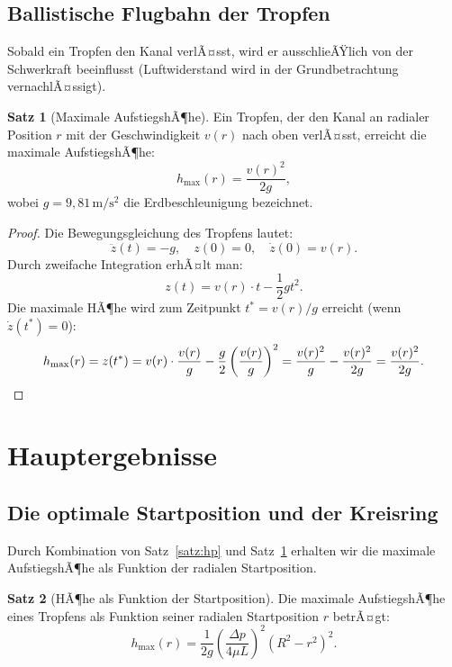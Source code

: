 ﻿\documentclass[a4paper,12pt]{article}
\theoremstyle{definition}
\newtheorem{satz}{Satz}
\begin{document}
\subsection{Ballistische Flugbahn der Tropfen}

Sobald ein Tropfen den Kanal verlÃ¤sst, wird er ausschlieÃŸlich von der Schwerkraft beeinflusst
(Luftwiderstand wird in der Grundbetrachtung vernachlÃ¤ssigt).

\begin{satz}[Maximale AufstiegshÃ¶he]
\label{satz:hoehe}
    Ein Tropfen, der den Kanal an radialer Position $r$ mit der Geschwindigkeit $v(r)$
    nach oben verlÃ¤sst, erreicht die maximale AufstiegshÃ¶he:
    \[
    h_{\max}(r) = \frac{v(r)^2}{2g},
    \]
    wobei $g = 9{,}81\,\mathrm{m/s^2}$ die Erdbeschleunigung bezeichnet.
\end{satz}

\begin{proof}
Die Bewegungsgleichung des Tropfens lautet:
\[
\ddot{z}(t) = -g, \quad z(0) = 0, \quad \dot{z}(0) = v(r).
\]
Durch zweifache Integration erhÃ¤lt man:
\[
z(t) = v(r) \cdot t - \frac{1}{2}g t^2.
\]
Die maximale HÃ¶he wird zum Zeitpunkt $t^* = v(r)/g$ erreicht (wenn $\dot{z}(t^*) = 0$):
\[
h_{\max}(r) = z(t^*) = v(r) \cdot \frac{v(r)}{g} - \frac{g}{2}\left(\frac{v(r)}{g}\right)^2
= \frac{v(r)^2}{g} - \frac{v(r)^2}{2g} = \frac{v(r)^2}{2g}. \qedhere
\]
\end{proof}

\section{Hauptergebnisse}

\subsection{Die optimale Startposition und der Kreisring}

Durch Kombination von Satz~\ref{satz:hp} und Satz~\ref{satz:hoehe} erhalten wir die
maximale AufstiegshÃ¶he als Funktion der radialen Startposition.

\begin{satz}[HÃ¶he als Funktion der Startposition]
\label{satz:hoehe_r}
    Die maximale AufstiegshÃ¶he eines Tropfens als Funktion seiner radialen Startposition $r$
    betrÃ¤gt:
    \[
    h_{\max}(r) = \frac{1}{2g}\left(\frac{\Delta p}{4\mu L}\right)^2 \left(R^2 - r^2\right)^2.
    \]
\end{satz}
\end{document}
